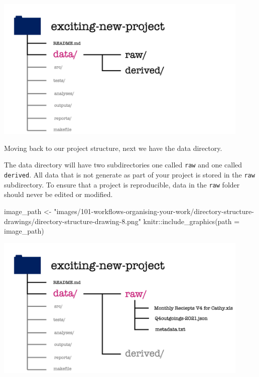 \documentclass[
  letterpaper,
  DIV=11,
  numbers=noendperiod]{scrreprt}
\newenvironment{Shaded}{\begin{snugshade}}{\end{snugshade}}
\newcommand{\AttributeTok}[1]{\textcolor[rgb]{0.40,0.45,0.13}{#1}}
\newcommand{\FunctionTok}[1]{\textcolor[rgb]{0.28,0.35,0.67}{#1}}
\newcommand{\NormalTok}[1]{\textcolor[rgb]{0.00,0.23,0.31}{#1}}
\newcommand{\OtherTok}[1]{\textcolor[rgb]{0.00,0.23,0.31}{#1}}
\newcommand{\SpecialCharTok}[1]{\textcolor[rgb]{0.37,0.37,0.37}{#1}}
\newcommand{\StringTok}[1]{\textcolor[rgb]{0.13,0.47,0.30}{#1}}
\begin{document}
\includegraphics[width=4.8in,height=\textheight]{images/101-workflows-organising-your-work/directory-structure-drawings/directory-structure-drawing-7.png}

Moving back to our project structure, next we have the data directory.

The data directory will have two subdirectories one called \texttt{raw}
and one called \texttt{derived}. All data that is not generate as part
of your project is stored in the \texttt{raw} subdirectory. To ensure
that a project is reproducible, data in the \texttt{raw} folder should
never be edited or modified.

\begin{Shaded}
\begin{Highlighting}[]
\NormalTok{image\_path }\OtherTok{\textless{}{-}} \StringTok{"images/101{-}workflows{-}organising{-}your{-}work/directory{-}structure{-}drawings/directory{-}structure{-}drawing{-}8.png"}
\NormalTok{knitr}\SpecialCharTok{::}\FunctionTok{include\_graphics}\NormalTok{(}\AttributeTok{path =}\NormalTok{ image\_path)}
\end{Highlighting}
\end{Shaded}

\includegraphics[width=4.8in,height=\textheight]{images/101-workflows-organising-your-work/directory-structure-drawings/directory-structure-drawing-8.png}
\end{document}
